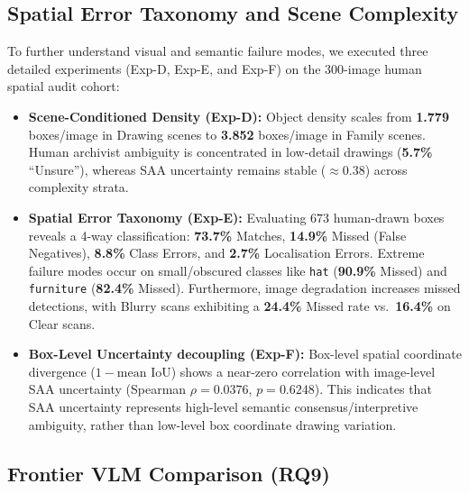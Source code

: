 \documentclass[11pt,a4paper]{article}
\theoremstyle{plain}
\begin{document}
\subsection{Spatial Error Taxonomy and Scene Complexity}

To further understand visual and semantic failure modes, we executed three detailed experiments (Exp-D, Exp-E, and Exp-F) on the 300-image human spatial audit cohort:
\begin{itemize}[leftmargin=2em, noitemsep]
  \item \textbf{Scene-Conditioned Density (Exp-D):} Object density scales from \textbf{1.779} boxes/image in Drawing scenes to \textbf{3.852} boxes/image in Family scenes. Human archivist ambiguity is concentrated in low-detail drawings (\textbf{5.7\%} ``Unsure''), whereas SAA uncertainty remains stable ($\approx 0.38$) across complexity strata.
  \item \textbf{Spatial Error Taxonomy (Exp-E):} Evaluating $673$ human-drawn boxes reveals a 4-way classification: \textbf{73.7\%} Matches, \textbf{14.9\%} Missed (False Negatives), \textbf{8.8\%} Class Errors, and \textbf{2.7\%} Localisation Errors. Extreme failure modes occur on small/obscured classes like \texttt{hat} (\textbf{90.9\%} Missed) and \texttt{furniture} (\textbf{82.4\%} Missed). Furthermore, image degradation increases missed detections, with Blurry scans exhibiting a \textbf{24.4\%} Missed rate vs.\ \textbf{16.4\%} on Clear scans.
  \item \textbf{Box-Level Uncertainty decoupling (Exp-F):} Box-level spatial coordinate divergence ($1 - \text{mean IoU}$) shows a near-zero correlation with image-level SAA uncertainty (Spearman $\rho = \mathbf{0.0376}$, $p = 0.6248$). This indicates that SAA uncertainty represents high-level semantic consensus/interpretive ambiguity, rather than low-level box coordinate drawing variation.
\end{itemize}

\subsection{Frontier VLM Comparison (RQ9)}
\end{document}
